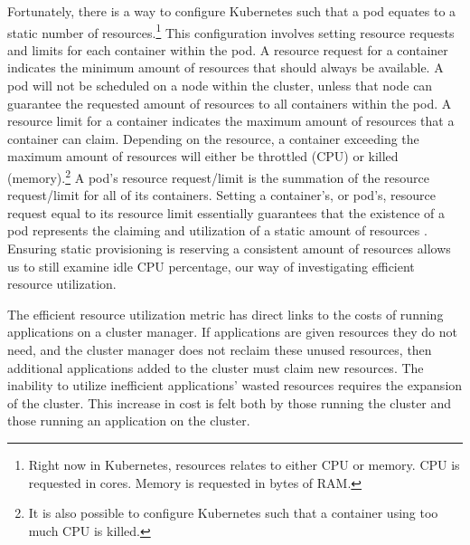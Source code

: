 Fortunately, there is a way to configure Kubernetes such that a pod
equates to a static number of resources.\footnote{Right now in Kubernetes,
resources relates to either CPU or memory. CPU is requested in cores. Memory is
requested in bytes of RAM.} This configuration involves
setting resource requests and limits for each container within the pod. A
resource request for a container indicates the minimum amount of resources that
should always be available. A pod will not be scheduled on a node within the
cluster, unless that node can guarantee the requested amount of resources to all
containers within the pod. A resource limit for a container indicates the
maximum amount of resources that a container can claim. Depending on the
resource, a container exceeding the maximum amount of resources will either be
throttled (CPU) or killed (memory).\footnote{It is also possible to configure
Kubernetes such that a container using too much CPU is killed.} A pod's resource
request/limit is the summation of the resource request/limit for all of its
containers. Setting a container's, or pod's, resource request equal to its
resource limit essentially guarantees that the existence of a pod represents the
claiming and utilization of a static amount of resources
\cite{k8s-compute-resources}. Ensuring static provisioning
is reserving a consistent amount of resources
allows us to still examine idle CPU percentage, our way of investigating
efficient resource utilization.

The efficient resource utilization metric has direct links to the costs of
running applications on a cluster manager. If applications are given resources
they do not need, and the cluster manager does not reclaim these unused
resources, then additional applications added to the cluster must claim new
resources. The inability to utilize inefficient applications' wasted resources
requires the expansion of the cluster. This increase in cost is felt
both by those running the cluster and those running an application on the
cluster.
